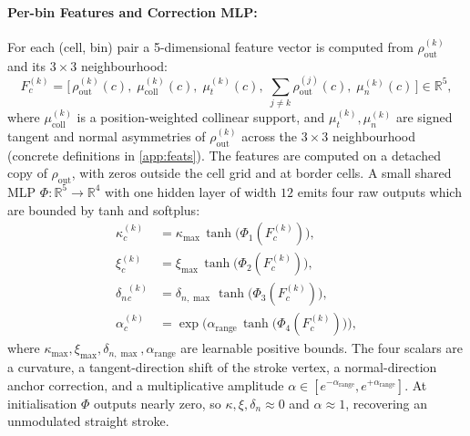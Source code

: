 \documentclass[11pt,a4paper]{article}
\newcommand{\R}{\mathbb{R}}
\begin{document}
\paragraph{Per-bin Features and Correction MLP:}
For each (cell, bin) pair a 5-dimensional feature vector is computed from $\rho_{\mathrm{out}}^{(k)}$ and its $3{\times}3$ neighbourhood:
\begin{equation}\label{eq:feats}
  F^{(k)}_c = \bigl[\, \rho_{\mathrm{out}}^{(k)}(c),\; \mu^{(k)}_{\mathrm{coll}}(c),\; \mu^{(k)}_{t}(c),\; \textstyle\sum_{j \neq k} \rho_{\mathrm{out}}^{(j)}(c),\; \mu^{(k)}_{n}(c)\,\bigr] \in \R^5,
\end{equation}
where $\mu^{(k)}_{\mathrm{coll}}$ is a position-weighted collinear support, and $\mu^{(k)}_{t}, \mu^{(k)}_{n}$ are signed tangent and normal asymmetries of $\rho_{\mathrm{out}}^{(k)}$ across the $3{\times}3$ neighbourhood (concrete definitions in \cref{app:feats}). The features are computed on a detached copy of $\rho_{\mathrm{out}}$, with zeros outside the cell grid and at border cells. A small shared MLP $\Phi : \R^5 \to \R^4$ with one hidden layer of width $12$ emits four raw outputs which are bounded by tanh and softplus:
\begin{equation}\label{eq:mlp-bounded}
  \begin{aligned}
    \kappa^{(k)}_c       &= \kappa_{\max}\, \tanh\!\bigl(\Phi_1(F^{(k)}_c)\bigr), \\
    \xi^{(k)}_c          &= \xi_{\max}\, \tanh\!\bigl(\Phi_2(F^{(k)}_c)\bigr), \\
    \delta_{n}{}^{(k)}_c &= \delta_{n,\max}\, \tanh\!\bigl(\Phi_3(F^{(k)}_c)\bigr), \\
    \alpha^{(k)}_c       &= \exp\!\bigl(\alpha_{\mathrm{range}}\, \tanh\!\bigl(\Phi_4(F^{(k)}_c)\bigr)\bigr),
  \end{aligned}
\end{equation}
where $\kappa_{\max}, \xi_{\max}, \delta_{n,\max}, \alpha_{\mathrm{range}}$ are learnable positive bounds. The four scalars are a curvature, a tangent-direction shift of the stroke vertex, a normal-direction anchor correction, and a multiplicative amplitude $\alpha \in [e^{-\alpha_{\mathrm{range}}}, e^{+\alpha_{\mathrm{range}}}]$. At initialisation $\Phi$ outputs nearly zero, so $\kappa, \xi, \delta_n \approx 0$ and $\alpha \approx 1$, recovering an unmodulated straight stroke.
\end{document}
